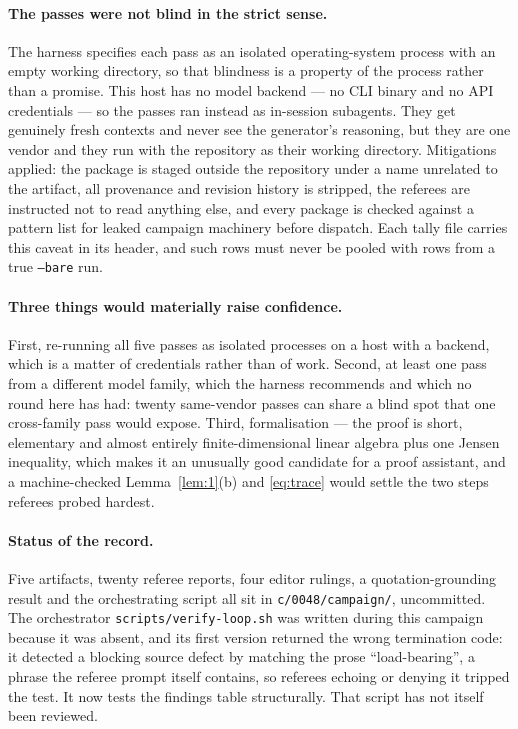 \documentclass[11pt]{article}
\theoremstyle{remark}
\begin{document}
\paragraph{The passes were not blind in the strict sense.} The harness specifies each pass as
an isolated operating-system process with an empty working directory, so that blindness is a
property of the process rather than a promise. This host has no model backend --- no CLI binary
and no API credentials --- so the passes ran instead as in-session subagents. They get genuinely
fresh contexts and never see the generator's reasoning, but they are one vendor and they run
with the repository as their working directory. Mitigations applied: the package is staged
outside the repository under a name unrelated to the artifact, all provenance and revision
history is stripped, the referees are instructed not to read anything else, and every package
is checked against a pattern list for leaked campaign machinery before dispatch. Each tally
file carries this caveat in its header, and such rows must never be pooled with rows from a
true \texttt{--bare} run.

\paragraph{Three things would materially raise confidence.} First, re-running all five passes
as isolated processes on a host with a backend, which is a matter of credentials rather than of
work. Second, at least one pass from a different model family, which the harness recommends and
which no round here has had: twenty same-vendor passes can share a blind spot that one
cross-family pass would expose. Third, formalisation --- the proof is short, elementary and
almost entirely finite-dimensional linear algebra plus one Jensen inequality, which makes it an
unusually good candidate for a proof assistant, and a machine-checked Lemma~\ref{lem:1}(b) and
\eqref{eq:trace} would settle the two steps referees probed hardest.

\paragraph{Status of the record.} Five artifacts, twenty referee reports, four editor rulings, a
quotation-grounding result and the orchestrating script all sit in
\texttt{c/0048/campaign/}, uncommitted. The orchestrator \texttt{scripts/verify-loop.sh} was
written during this campaign because it was absent, and its first version returned the wrong
termination code: it detected a blocking source defect by matching the prose ``load-bearing'',
a phrase the referee prompt itself contains, so referees echoing or denying it tripped the
test. It now tests the findings table structurally. That script has not itself been reviewed.
\end{document}

